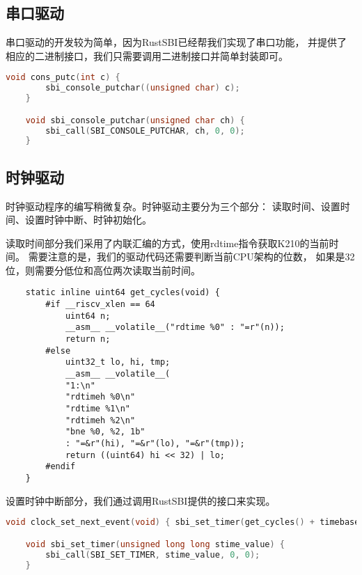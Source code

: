 \subsection{串口驱动}

串口驱动的开发较为简单，因为RustSBI已经帮我们实现了串口功能，
并提供了相应的二进制接口，我们只需要调用二进制接口并简单封装即可。

\begin{lstlisting}[caption={串口驱动}, label={lst:uart_driver}, language=C]
    void cons_putc(int c) {
        sbi_console_putchar((unsigned char) c);
    }    

    void sbi_console_putchar(unsigned char ch) {
        sbi_call(SBI_CONSOLE_PUTCHAR, ch, 0, 0);
    }    
\end{lstlisting}

\subsection{时钟驱动}

时钟驱动程序的编写稍微复杂。时钟驱动主要分为三个部分：
读取时间、设置时间、设置时钟中断、时钟初始化。

读取时间部分我们采用了内联汇编的方式，使用rdtime指令获取K210的当前时间。
需要注意的是，我们的驱动代码还需要判断当前CPU架构的位数，
如果是32位，则需要分低位和高位两次读取当前时间。

\begin{lstlisting}
    static inline uint64 get_cycles(void) {
        #if __riscv_xlen == 64
            uint64 n;
            __asm__ __volatile__("rdtime %0" : "=r"(n));
            return n;
        #else
            uint32_t lo, hi, tmp;
            __asm__ __volatile__(
            "1:\n"
            "rdtimeh %0\n"
            "rdtime %1\n"
            "rdtimeh %2\n"
            "bne %0, %2, 1b"
            : "=&r"(hi), "=&r"(lo), "=&r"(tmp));
            return ((uint64) hi << 32) | lo;
        #endif
    }    
\end{lstlisting}

设置时钟中断部分，我们通过调用RustSBI提供的接口来实现。

\begin{lstlisting}[caption={设置时钟中断}, label={lst:set_clock_interrupt}, language=C]
    void clock_set_next_event(void) { sbi_set_timer(get_cycles() + timebase); }

    void sbi_set_timer(unsigned long long stime_value) {
        sbi_call(SBI_SET_TIMER, stime_value, 0, 0);
    }  
\end{lstlisting}


